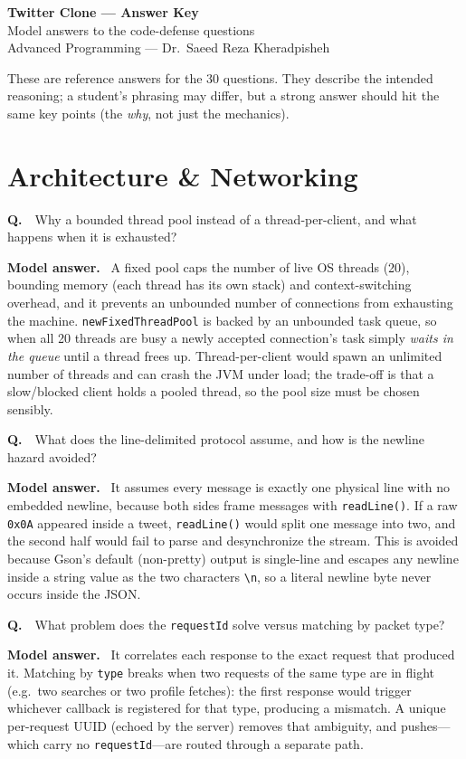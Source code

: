 \documentclass[11pt]{article}
\newcounter{q}
\newcommand{\qa}[2]{%
  \refstepcounter{q}%
  \medskip\par\noindent\textbf{Q\theq.}\ \ #1\par
  \smallskip\noindent\textcolor{answergreen}{\textbf{Model answer.}}\ #2\par
}
\newcommand{\code}[1]{\texttt{#1}}
\begin{document}
\begin{center}
  {\LARGE\bfseries Twitter Clone --- Answer Key}\\[4pt]
  {\large Model answers to the code-defense questions}\\[2pt]
  {\color{gray}Advanced Programming --- Dr.\ Saeed Reza Kheradpisheh}
\end{center}

\vspace{4pt}
\noindent
These are reference answers for the 30 questions. They describe the intended
reasoning; a student's phrasing may differ, but a strong answer should hit the
same key points (the \emph{why}, not just the mechanics).

\section{Architecture \& Networking}

\qa{Why a bounded thread pool instead of a thread-per-client, and what happens
when it is exhausted?}{%
A fixed pool caps the number of live OS threads (20), bounding memory (each
thread has its own stack) and context-switching overhead, and it prevents an
unbounded number of connections from exhausting the machine. \code{newFixedThreadPool}
is backed by an unbounded task queue, so when all 20 threads are busy a newly
accepted connection's task simply \emph{waits in the queue} until a thread frees
up. Thread-per-client would spawn an unlimited number of threads and can crash the
JVM under load; the trade-off is that a slow/blocked client holds a pooled thread,
so the pool size must be chosen sensibly.}

\qa{What does the line-delimited protocol assume, and how is the newline hazard
avoided?}{%
It assumes every message is exactly one physical line with no embedded newline,
because both sides frame messages with \code{readLine()}. If a raw \code{0x0A}
appeared inside a tweet, \code{readLine()} would split one message into two, and
the second half would fail to parse and desynchronize the stream. This is avoided
because Gson's default (non-pretty) output is single-line and escapes any newline
inside a string value as the two characters \code{\textbackslash n}, so a literal
newline byte never occurs inside the JSON.}

\qa{What problem does the \code{requestId} solve versus matching by packet
type?}{%
It correlates each response to the exact request that produced it. Matching by
\code{type} breaks when two requests of the same type are in flight (e.g.\ two
searches or two profile fetches): the first response would trigger whichever
callback is registered for that type, producing a mismatch. A unique per-request
UUID (echoed by the server) removes that ambiguity, and pushes---which carry no
\code{requestId}---are routed through a separate path.}
\end{document}
